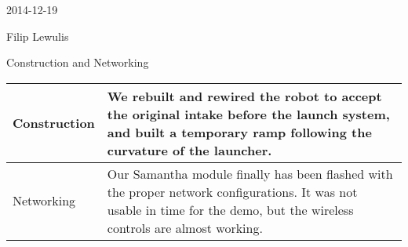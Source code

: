 2014-12-19

Filip Lewulis

Construction and Networking

\begin{tabular}{|p{5cm}|p{5cm}|}
\hline Construction &
We rebuilt and rewired the robot to accept the original intake before the launch system,
and built a temporary ramp following the curvature of the launcher. \\
\hline Networking &
Our Samantha module finally has been flashed with the proper network configurations. It
was not usable in time for the demo, but the wireless controls are almost working. \\
\hline
\end{tabular}